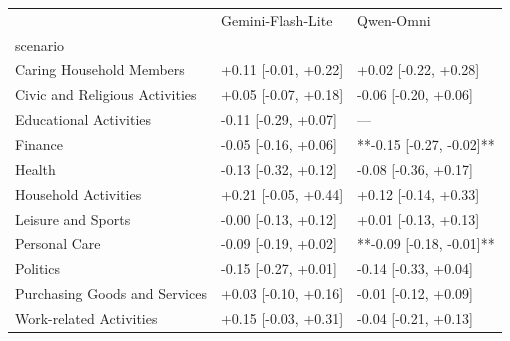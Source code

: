 \begin{tabular}{lll}
\toprule
 & Gemini-Flash-Lite & Qwen-Omni \\
scenario &  &  \\
\midrule
Caring Household Members & +0.11 [-0.01, +0.22] & +0.02 [-0.22, +0.28] \\
Civic and Religious Activities & +0.05 [-0.07, +0.18] & -0.06 [-0.20, +0.06] \\
Educational Activities & -0.11 [-0.29, +0.07] & — \\
Finance & -0.05 [-0.16, +0.06] & **-0.15 [-0.27, -0.02]** \\
Health & -0.13 [-0.32, +0.12] & -0.08 [-0.36, +0.17] \\
Household Activities & +0.21 [-0.05, +0.44] & +0.12 [-0.14, +0.33] \\
Leisure and Sports & -0.00 [-0.13, +0.12] & +0.01 [-0.13, +0.13] \\
Personal Care & -0.09 [-0.19, +0.02] & **-0.09 [-0.18, -0.01]** \\
Politics & -0.15 [-0.27, +0.01] & -0.14 [-0.33, +0.04] \\
Purchasing Goods and Services & +0.03 [-0.10, +0.16] & -0.01 [-0.12, +0.09] \\
Work-related Activities & +0.15 [-0.03, +0.31] & -0.04 [-0.21, +0.13] \\
\bottomrule
\end{tabular}

